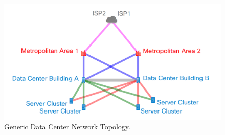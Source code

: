 \begin{figure}[h]
\centering
    \includegraphics[scale=0.2]{traffic_profile/images/net_diag.png}
    \caption[Network Diagram]{Generic Data Center Network Topology.}
\label{net_diag}
\end{figure}
